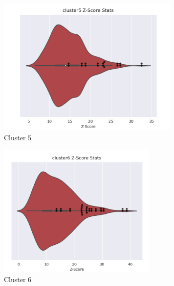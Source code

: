 \begin{figure}[htb]
\begin{subfigure}{0.2\textwidth}
  \includegraphics[width=\linewidth]{Pfam/cl05.png}
  \caption{Cluster 5}
  \label{fig:cl05}
\end{subfigure}\hfil %
\begin{subfigure}{0.2\textwidth}
  \includegraphics[width=\linewidth]{Pfam/cl06.png}
  \caption{Cluster 6}
  \label{fig:cl06}
\end{subfigure}\hfil %
\begin{subfigure}{0.2\textwidth}

\end{subfigure}
\end{figure}
